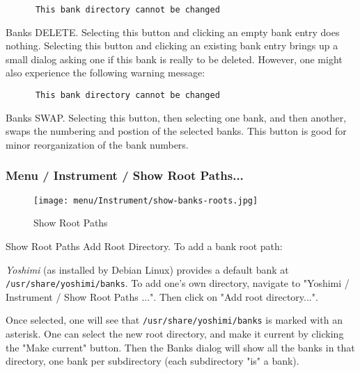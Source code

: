    \begin{verbatim}
      This bank directory cannot be changed
   \end{verbatim}

   Banks DELETE.
   Selecting this button and clicking an empty bank entry does nothing.
   Selecting this button and clicking an existing bank entry brings up a
   small dialog asking one if this bank is really to be deleted.
   However, one might also experience the following warning message:

   \begin{verbatim}
      This bank directory cannot be changed
   \end{verbatim}

   Banks SWAP.
   Selecting this button, then selecting one bank, and then another,
   swaps the numbering and postion of the selected banks.
   This button is good for minor reorganization of the bank numbers.

\subsubsection{Menu / Instrument / Show Root Paths...}
\label{subsubsec:menu_instrument_show_root_paths}

\begin{figure}[H]
   \centering 
   \texttt{[image: menu/Instrument/show-banks-roots.jpg]}
   \caption[Show Root Paths]{Show Root Paths}
   \label{fig:show_banks_roots}
\end{figure}

   \setcounter{ItemCounter}{0}      %

   Show Root Paths Add Root Directory.
   To add a bank root path:

   \textsl{Yoshimi} (as installed by Debian Linux) provides a default bank at
   \texttt{/usr/share/yoshimi/banks}.
   To add one's own directory, navigate to "Yoshimi / Instrument / Show Root
   Paths ...".  Then click on "Add root directory...".

   Once selected, one will see that \texttt{/usr/share/yoshimi/banks}
   is marked with an asterisk.  One can select the new root directory,
   and make it current by clicking the "Make current" button.
   Then the Banks dialog will show all the banks in that directory, one bank
   per subdirectory (each subdirectory "is" a bank).

